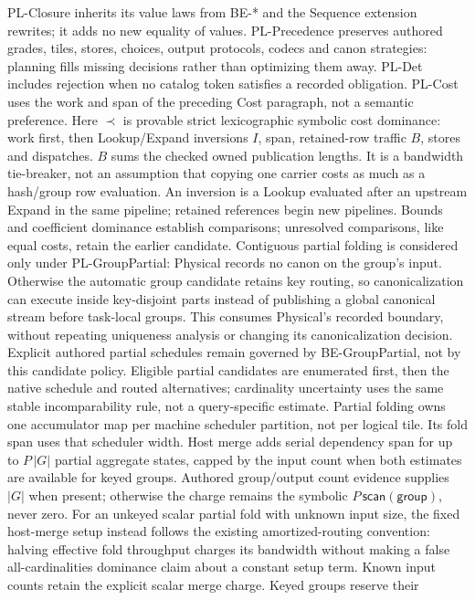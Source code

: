 PL-Closure inherits its value laws from BE-* and the Sequence extension
rewrites; it adds no new equality of values. PL-Precedence preserves
authored grades, tiles, stores, choices, output protocols, codecs and canon
strategies: planning fills missing decisions rather than optimizing them away.
PL-Det includes rejection when no catalog token satisfies a recorded
obligation. PL-Cost uses the work and span of the preceding Cost paragraph,
not a semantic preference. Here $\prec$ is provable strict lexicographic
symbolic cost dominance: work first, then Lookup/Expand inversions $I$,
span, retained-row traffic $B$, stores and dispatches. $B$ sums the checked
owned publication lengths. It is a bandwidth tie-breaker, not an assumption
that copying one carrier costs as much as a hash/group row evaluation.
An inversion is a Lookup evaluated after an upstream Expand in the same
pipeline; retained references begin new pipelines.
Bounds and coefficient dominance establish comparisons; unresolved
comparisons, like equal costs, retain the earlier candidate.
Contiguous partial folding is considered only under PL-GroupPartial: Physical
records no canon on the group's input. Otherwise the automatic group candidate
retains key routing, so canonicalization can execute inside key-disjoint parts
instead of publishing a global canonical stream before task-local groups.
This consumes Physical's recorded boundary, without repeating uniqueness
analysis or changing its canonicalization decision. Explicit authored partial
schedules remain governed by BE-GroupPartial, not by this candidate policy.
Eligible partial candidates are enumerated first, then the native schedule
and routed alternatives; cardinality uncertainty uses the same stable
incomparability rule, not a query-specific estimate.
Partial folding owns one accumulator map per machine scheduler partition,
not per logical tile. Its fold span uses that scheduler width. Host merge
adds serial dependency span for up to $P\,|G|$ partial aggregate states,
capped by the input count when both estimates are available for keyed groups.
Authored group/output count evidence supplies $|G|$ when present; otherwise
the charge remains the symbolic $P\,\mathsf{scan}(\mathsf{group})$, never zero.
For an unkeyed scalar partial fold with unknown input size, the fixed host-merge
setup instead follows the existing amortized-routing convention: halving
effective fold throughput charges its bandwidth without making a false
all-cardinalities dominance claim about a constant setup term. Known input
counts retain the explicit scalar merge charge. Keyed groups reserve their
